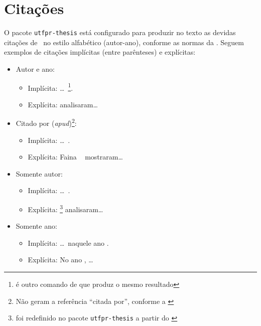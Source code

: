 \section{Citações}%
\label{sect:cit}

O pacote \texttt{utfpr-thesis} está configurado para produzir no texto as devidas citações de \ no estilo alfabético (autor-ano), conforme as normas da .
Seguem exemplos de citações implícitas (entre parênteses) e explícitas:

\begin{itemize}
\item Autor e ano:
\begin{itemize}
\item Implícita: \ldots~\cite{Pinto2000}\footnote{ é outro comando de  que produz o mesmo resultado}.
\item Explícita: \textcite{Pinto2000} analisaram\ldots%
\end{itemize}
\item Citado por (\textit{apud})\footnote{Não geram a referência \enquote{citada por}, conforme a \textcite[ 7.3 \ppno~14 da  10520]{ABNT2023NBR10520}}:
\begin{itemize}
\item Implícita: \ldots\ .
\item Explícita: Faina \etal\  mostraram\ldots%
\end{itemize}
\item Somente autor:
\begin{itemize}
\item Implícita: \ldots\ \citeauthor{Pinto2000}.
\item Explícita: \citeauthor*{Pinto2000}\footnote{ foi redefinido no pacote \texttt{utfpr-thesis} a partir do \href{https://ctan.org/pkg/biblatex}{\LinkIcon}} analisaram\ldots%
\end{itemize}
\item Somente ano:
\begin{itemize}
\item Implícita: \ldots\ naquele ano \citeyear{Faina2000}.
\item Explícita: No ano \citeyear*{Faina2000}, \ldots%
\end{itemize}
\end{itemize}

